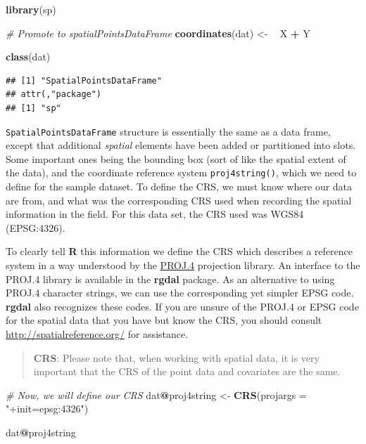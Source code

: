 \documentclass[10pt,b5paper,]{book}
\newenvironment{Shaded}{\begin{snugshade}}{\end{snugshade}}
\newcommand{\CommentTok}[1]{\textcolor[rgb]{0.56,0.35,0.01}{\textit{#1}}}
\newcommand{\DataTypeTok}[1]{\textcolor[rgb]{0.13,0.29,0.53}{#1}}
\newcommand{\ErrorTok}[1]{\textcolor[rgb]{0.64,0.00,0.00}{\textbf{#1}}}
\newcommand{\KeywordTok}[1]{\textcolor[rgb]{0.13,0.29,0.53}{\textbf{#1}}}
\newcommand{\NormalTok}[1]{#1}
\newcommand{\OperatorTok}[1]{\textcolor[rgb]{0.81,0.36,0.00}{\textbf{#1}}}
\newcommand{\StringTok}[1]{\textcolor[rgb]{0.31,0.60,0.02}{#1}}
\theoremstyle{definition}
\theoremstyle{definition}
\theoremstyle{definition}
\theoremstyle{remark}
\begin{document}
\begin{Shaded}
\begin{Highlighting}[]
\KeywordTok{library}\NormalTok{(sp)}

\CommentTok{# Promote to spatialPointsDataFrame}
\KeywordTok{coordinates}\NormalTok{(dat) <-}\StringTok{ }\ErrorTok{~}\StringTok{ }\NormalTok{X }\OperatorTok{+}\StringTok{ }\NormalTok{Y}

\KeywordTok{class}\NormalTok{(dat)}
\end{Highlighting}
\end{Shaded}

\begin{verbatim}
## [1] "SpatialPointsDataFrame"
## attr(,"package")
## [1] "sp"
\end{verbatim}

\texttt{SpatialPointsDataFrame} structure is essentially the same as a
data frame, except that additional \emph{spatial} elements have been
added or partitioned into slots. Some important ones being the bounding
box (sort of like the spatial extent of the data), and the coordinate
reference system \texttt{proj4string()}, which we need to define for the
sample dataset. To define the CRS, we must know where our data are from,
and what was the corresponding CRS used when recording the spatial
information in the field. For this data set, the CRS used was WGS84
(EPSG:4326).

To clearly tell \textbf{R} this information we define the CRS which
describes a reference system in a way understood by the
\href{http://trac.osgeo.org/proj/}{PROJ.4} projection library. An
interface to the PROJ.4 library is available in the \textbf{rgdal}
package. As an alternative to using PROJ.4 character strings, we can use
the corresponding yet simpler EPSG code. \textbf{rgdal} also recognizes
these codes. If you are unsure of the PROJ.4 or EPSG code for the
spatial data that you have but know the CRS, you should consult
\url{http://spatialreference.org/} for assistance.

\begin{quote}
\textbf{CRS}: Please note that, when working with spatial data, it is
very important that the CRS of the point data and covariates are the
same.
\end{quote}

\begin{Shaded}
\begin{Highlighting}[]
\CommentTok{# Now, we will define our CRS}
\NormalTok{dat}\OperatorTok{@}\NormalTok{proj4string <-}\StringTok{ }\KeywordTok{CRS}\NormalTok{(}\DataTypeTok{projargs =} \StringTok{"+init=epsg:4326"}\NormalTok{)}

\NormalTok{dat}\OperatorTok{@}\NormalTok{proj4string}
\end{Highlighting}
\end{Shaded}
\end{document}

